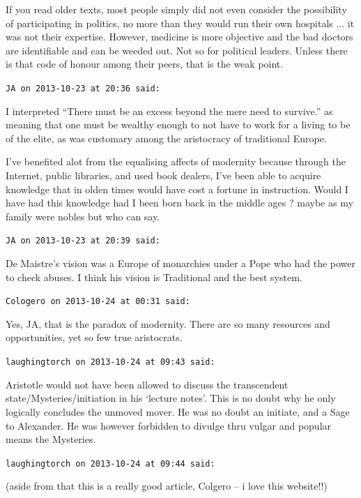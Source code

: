 \begin{footnotesize}
\begin{sffamily}
If you read older texts, most people simply did not even consider the possibility of participating in politics, no more than they would run their own hospitals ... it was not their expertise. However, medicine is more objective and the bad doctors are identifiable and can be weeded out. Not so for political leaders. Unless there is that code of honour among their peers, that is the weak point.

\hfill

\texttt{JA on 2013-10-23 at 20:36 said:}

I interpreted ``There must be an excess beyond the mere need to survive.'' as meaning that one must be wealthy enough to not have to work for a living to be of the elite, as was customary among the aristocracy of traditional Europe.

I've benefited alot from the equalising affects of modernity because through the Internet, public libraries, and used book dealers, I've been able to acquire knowledge that in olden times would have cost a fortune in instruction. Would I have had this knowledge had I been born back in the middle ages ? maybe as my family were nobles but who can say.

\hfill

\texttt{JA on 2013-10-23 at 20:39 said:}

De Maistre's vision was a Europe of monarchies under a Pope who had the power to check abuses. I think his vision is Traditional and the best system.

\hfill

\texttt{Cologero on 2013-10-24 at 00:31 said:}

Yes, JA, that is the paradox of modernity. There are so many resources and opportunities, yet so few true aristocrats.

\hfill

\texttt{laughingtorch on 2013-10-24 at 09:43 said:}

Aristotle would not have been allowed to discuss the transcendent state/Mysteries/initiation in his `lecture notes'. This is no doubt why he only logically concludes the unmoved mover. He was no doubt an initiate, and a Sage to Alexander. He was however forbidden to divulge thru vulgar and popular means the Mysteries.

\hfill

\texttt{laughingtorch on 2013-10-24 at 09:44 said:}

(aside from that this is a really good article, Colgero -- i love this website!!)


\end{sffamily}
\end{footnotesize}
